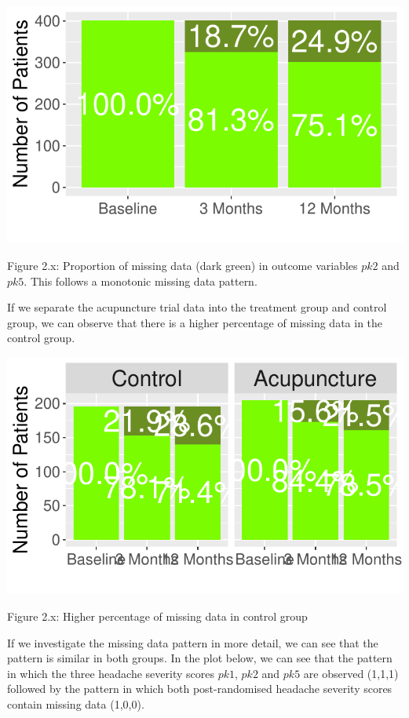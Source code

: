 \documentclass{article}
\newcommand{\pandocbounded}[1]{#1}
\begin{document}
\pandocbounded{\includegraphics[keepaspectratio]{Final_Report_files/figure-latex/unnamed-chunk-22-1.pdf}}

Figure 2.x: Proportion of missing data (dark green) in outcome variables
\(pk2\) and \(pk5\). This follows a monotonic missing data pattern.

If we separate the acupuncture trial data into the treatment group and
control group, we can observe that there is a higher percentage of
missing data in the control group.

\pandocbounded{\includegraphics[keepaspectratio]{Final_Report_files/figure-latex/unnamed-chunk-23-1.pdf}}

Figure 2.x: Higher percentage of missing data in control group

If we investigate the missing data pattern in more detail, we can see
that the pattern is similar in both groups. In the plot below, we can
see that the pattern in which the three headache severity scores
\(pk1\), \(pk2\) and \(pk5\) are observed (1,1,1) followed by the
pattern in which both post-randomised headache severity scores contain
missing data (1,0,0).
\end{document}
